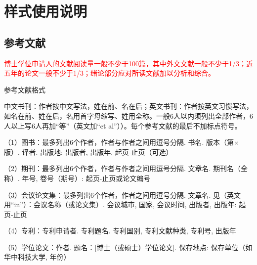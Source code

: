 \chapter{样式使用说明}
\label{cha:command}


\section{参考文献}
\textcolor{red}{博士学位申请人的文献阅读量一般不少于100篇，其中外文文献一般不少于1/3；近五年的论文一般不少于1/3；绪论部分应对所读文献加以分析和综合。}

参考文献格式

中文书刊：作者按中文写法，姓在前、名在后；英文书刊：作者按英文习惯写法，如名在前、姓在后，名用首字母缩写、姓用全称。一般6人以内须列出全部作者，6人以上写6人再加“等”（英文加“et al”））。每个参考文献的最后不加标点符号。

（1）图书：最多列出6个作者，作者与作者之间用逗号分隔. 书名. 版本（第×版）. 译者. 出版地: 出版者, 出版年. 起页-止页（可选）

（2）期刊：最多列出6个作者，作者与作者之间用逗号分隔. 文章名. 期刊名（全称）. 年号, 卷号（期号）: 起页-止页或论文编号

（3）会议论文集：最多列出6个作者，作者之间用逗号分隔. 文章名. 见（英文用“in”）：会议名称（或论文集）. 会议城市, 国家, 会议时间, 出版者, 出版年: 起页-止页

（4）专利：专利申请者. 专利题名. 专利国别, 专利文献种类, 专利号, 出版年

（5）学位论文：作者. 题名：[博士（或硕士）学位论文]. 保存地点: 保存单位（如华中科技大学, 年份）

